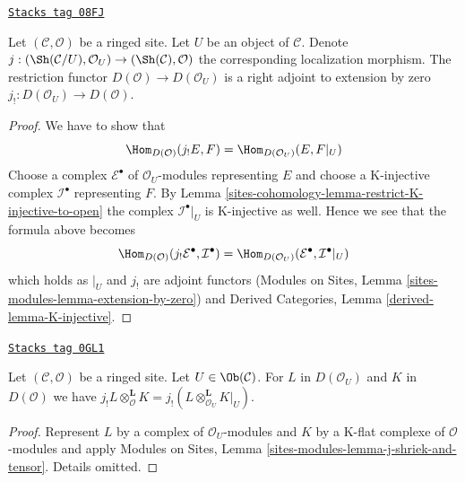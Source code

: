 \begin{lemma}
\label{sites-cohomology-lemma-adjoint-lower-shriek-restrict}
\href{https://stacks.math.columbia.edu/tag/08FJ}{\texttt{Stacks tag 08FJ}}

Let $(\mathcal{C}, \mathcal{O})$ be a ringed site. Let $U$ be an
object of $\mathcal{C}$. Denote
$j : (\Sh(\mathcal{C}/U), \mathcal{O}_U) \to (\Sh(\mathcal{C}), \mathcal{O})$
the corresponding localization morphism. The restriction functor
$D(\mathcal{O}) \to D(\mathcal{O}_U)$ is a right adjoint to
extension by zero $j_! : D(\mathcal{O}_U) \to D(\mathcal{O})$.
\end{lemma}

\begin{proof}
We have to show that
$$
\Hom_{D(\mathcal{O})}(j_!E, F) = \Hom_{D(\mathcal{O}_U)}(E, F|_U)
$$
Choose a complex $\mathcal{E}^\bullet$ of $\mathcal{O}_U$-modules
representing $E$ and choose
a K-injective complex $\mathcal{I}^\bullet$ representing $F$.
By Lemma \ref{sites-cohomology-lemma-restrict-K-injective-to-open} the complex
$\mathcal{I}^\bullet|_U$ is K-injective as well. Hence we see that
the formula above becomes
$$
\Hom_{D(\mathcal{O})}(j_!\mathcal{E}^\bullet, \mathcal{I}^\bullet) =
\Hom_{D(\mathcal{O}_U)}(\mathcal{E}^\bullet, \mathcal{I}^\bullet|_U)
$$
which holds as $|_U$ and $j_!$ are adjoint functors
(Modules on Sites, Lemma \ref{sites-modules-lemma-extension-by-zero})
and
Derived Categories, Lemma \ref{derived-lemma-K-injective}.
\end{proof}

\begin{lemma}
\label{sites-cohomology-lemma-j-shriek-and-tensor}
\href{https://stacks.math.columbia.edu/tag/0GL1}{\texttt{Stacks tag 0GL1}}

Let $(\mathcal{C}, \mathcal{O})$ be a ringed site. Let $U \in \Ob(\mathcal{C})$.
For $L$ in $D(\mathcal{O}_U)$ and $K$ in $D(\mathcal{O})$ we have
$j_!L \otimes_\mathcal{O}^\mathbf{L} K =
j_!(L \otimes_{\mathcal{O}_U}^\mathbf{L} K|_U)$.
\end{lemma}

\begin{proof}
Represent $L$ by a complex of $\mathcal{O}_U$-modules and $K$ by a K-flat
complexe of $\mathcal{O}$-modules and apply
Modules on Sites, Lemma \ref{sites-modules-lemma-j-shriek-and-tensor}.
Details omitted.
\end{proof}

